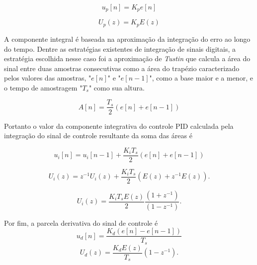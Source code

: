 \begin{equation}
    \label{eq:cd_6}
    u_p[n] = K_pe[n]
\end{equation}

\begin{equation}
    \label{eq:cd_6.1}
    U_p(z) = K_pE(z)
\end{equation}

A componente integral é baseada na aproximação da integração do erro ao longo do tempo. Dentre as estratégias existentes de integração de sinais digitais, a estratégia escolhida nesse caso foi a aproximação de \textit{Tustin} que calcula a área do sinal entre duas amostras consecutivas como a área do trapézio caracterizado pelos valores das amostras, "$e[n]$" e "$e[n-1]$", como a base maior e a menor, e o tempo de amostragem "$T_s$" como sua altura.

\begin{equation}
    \label{eq:cd_7}
    A[n] = \frac{T_s}{2} (e[n]+e[n-1])
\end{equation}

Portanto o valor da componente integrativa do controle PID calculada pela integração do sinal de controle resultante da soma das áreas é

\begin{equation}
    \label{eq:cd_8}
    u_i[n] = u_i[n-1] + \frac{K_iT_s}{2} (e[n]+e[n-1])
\end{equation}


\begin{equation}
    \label{eq:cd_8.1}
    U_i(z) = z^{-1}U_i(z) + \frac{K_iT_s}{2} (E(z)+z^{-1}E(z)).
\end{equation}

\begin{equation}
    \label{eq:cd_8.2}
    U_i(z) =\frac{K_iT_sE(z)}{2} \frac{(1+z^{-1})}{(1-z^{-1})}.
\end{equation}

Por fim, a parcela derivativa do sinal de controle é
\begin{equation}
    \label{eq:cd_9}
    u_d[n] = \frac{K_d(e[n]-e[n-1])}{T_s}
\end{equation}
\begin{equation}
    \label{eq:cd_9.1}
    U_d(z) = \frac{K_dE(z)}{T_s} (1-z^{-1}).
\end{equation}

